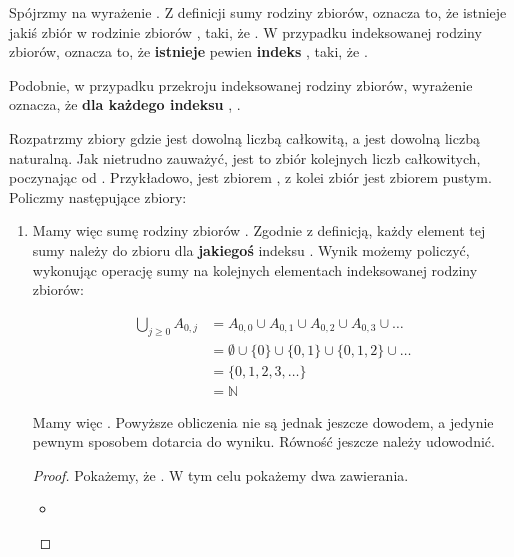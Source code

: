 Spójrzmy na wyrażenie . Z definicji sumy rodziny zbiorów, oznacza to, że istnieje jakiś zbiór  w rodzinie zbiorów , taki, że . W przypadku indeksowanej rodziny zbiorów, oznacza to, że \textbf{istnieje} pewien \textbf{indeks} , taki, że .

Podobnie, w przypadku przekroju indeksowanej rodziny zbiorów, wyrażenie  oznacza, że \textbf{dla każdego indeksu} , .

\begin{example}
\label{example:indexed-family}
Rozpatrzmy zbiory  gdzie  jest dowolną liczbą całkowitą, a  jest dowolną liczbą naturalną. Jak nietrudno zauważyć, jest to zbiór  kolejnych liczb całkowitych, poczynając od . Przykładowo,  jest zbiorem , z kolei zbiór  jest zbiorem pustym. Policzmy następujące zbiory:

\begin{enumerate}
    \item {}
    
    Mamy więc sumę rodziny zbiorów . Zgodnie z definicją, każdy element tej sumy należy do zbioru  dla \textbf{jakiegoś} indeksu . Wynik możemy policzyć, wykonując operację sumy na kolejnych elementach indeksowanej rodziny zbiorów:
    
    \[
        \begin{split}
            \bigcup\limits_{j \geq 0} A_{0,j} 
            &= A_{0,0} \cup A_{0,1} \cup A_{0,2} \cup A_{0,3} \cup \dots 
            \\&= \emptyset \cup \{ 0 \} \cup \{ 0,1 \} \cup \{ 0,1,2 \} \cup \dots
            \\&= \{ 0,1,2,3,\dots \}
            \\&= \mathbb{N}
        \end{split}
    \]
    
    Mamy więc . Powyższe obliczenia nie są jednak jeszcze dowodem, a jedynie pewnym sposobem dotarcia do wyniku. Równość jeszcze należy udowodnić.
    
    \begin{proof}
    Pokażemy, że . W tym celu pokażemy dwa zawierania.
    \begin{itemize}
        \item {}
        

\end{itemize}
\end{proof}
\end{enumerate}
\end{example}
